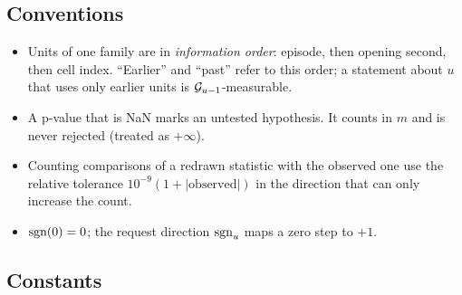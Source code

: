 \subsection*{Conventions}

\begin{itemize}
\item Units of one family are in \emph{information order}: episode, then opening second, then cell index. ``Earlier'' and ``past'' refer to this order; a statement about $u$ that uses only earlier units is $\mathcal{G}_{u-1}$-measurable.
\item A p-value that is NaN marks an untested hypothesis. It counts in $m$ and is never rejected (treated as $+\infty$).
\item Counting comparisons of a redrawn statistic with the observed one use the relative tolerance $10^{-9}(1 + |\text{observed}|)$ in the direction that can only increase the count.
\item $\mathrm{sgn}(0) = 0$; the request direction $\mathrm{sgn}_u$ maps a zero step to $+1$.
\end{itemize}

\subsection*{Constants}

